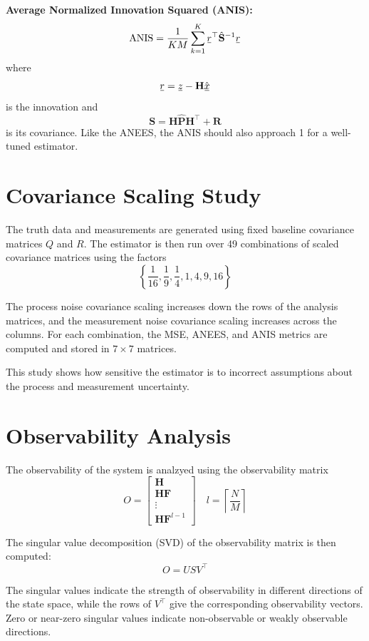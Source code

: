 \documentclass[11pt, letterpaper, twocolumn]{article}
\newcommand{\ul}[1] %
    {{}\mkern1mu\underline{\mkern-1mu#1\mkern-1mu}\mkern1mu}
\begin{document}
\textbf{Average Normalized Innovation Squared (ANIS):}
\[
\mathrm{ANIS} = \frac{1}{KM} \sum_{k=1}^{K} \ul{r}^{\top}\hat{\mathbf{S}}^{-1}\ul{r}
\]
where
\[
\ul{r} = \ul{z} - \mathbf{H}\hat{\ul{x}}
\]
is the innovation and
\[
\mathbf{S} = \mathbf{H}\hat{\mathbf{P}}\mathbf{H}^{\top} + \mathbf{R}
\]
is its covariance. Like the ANEES, the ANIS should also approach 1 for a 
well-tuned estimator.

\section*{Covariance Scaling Study}

The truth data and measurements are generated using fixed baseline covariance
matrices $Q$ and $R$. The estimator is then run over 49 combinations of scaled
covariance matrices using the factors
\[
\left\{ \frac{1}{16}, \frac{1}{9}, \frac{1}{4}, 1, 4, 9, 16 \right\}
\]

The process noise covariance scaling increases down the rows of the analysis
matrices, and the measurement noise covariance scaling increases across the 
columns. For each combination, the MSE, ANEES, and ANIS metrics are computed
and stored in $7 \times 7$ matrices.

This study shows how sensitive the estimator is to incorrect assumptions 
about the process and measurement uncertainty.

\section*{Observability Analysis}

The observability of the system is analzyed using the observability matrix
\[
O = \begin{bmatrix}
    \mathbf{H} \\
    \mathbf{HF} \\
    \vdots \\
    \mathbf{H}\mathbf{F}^{l-1}
\end{bmatrix} \quad
l = \left\lceil \frac{N}{M} \right\rceil
\]

The singular value decomposition (SVD) of the observability matrix is then computed:
\[
O = USV^{\top}
\]

The singular values indicate the strength of observability in different directions of
the state space, while the rows of $V^{\top}$ give the corresponding observability
vectors. Zero or near-zero singular values indicate non-observable or weakly 
observable directions.
\end{document}
